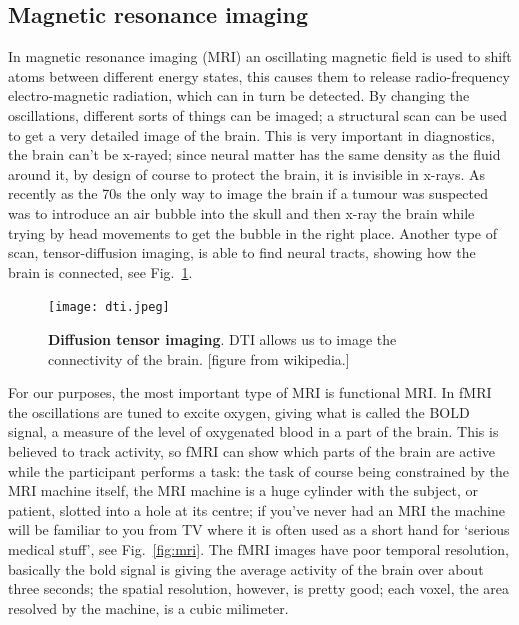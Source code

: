 \documentclass[12pt]{article}
\begin{document}
\subsection*{Magnetic resonance imaging}

In magnetic resonance imaging (MRI) an oscillating magnetic field is
used to shift atoms between different energy states, this causes them
to release radio-frequency electro-magnetic radiation, which can in
turn be detected. By changing the oscillations, different sorts of
things can be imaged; a structural scan can be used to get a very
detailed image of the brain. This is very important in diagnostics,
the brain can't be x-rayed; since neural matter has the same density
as the fluid around it, by design of course to protect the brain, it
is invisible in x-rays. As recently as the 70s the only way to image
the brain if a tumour was suspected was to introduce an air bubble
into the skull and then x-ray the brain while trying by head movements
to get the bubble in the right place. Another type of scan,
tensor-diffusion imaging, is able to find neural tracts, showing how the brain is connected, see Fig.~\ref{fig:dti}.


\begin{figure}
  \begin{center}
    \texttt{[image: dti.jpeg]}
    \end{center}
  \caption{\textbf{Diffusion tensor imaging}. DTI allows us to image the connectivity of the brain. [figure from wikipedia.]\label{fig:dti}}
\end{figure}

For our purposes, the most important type of MRI is functional MRI. In
fMRI the oscillations are tuned to excite oxygen, giving what is
called the BOLD signal, a measure of the level of oxygenated blood in
a part of the brain. This is believed to track activity, so fMRI can
show which parts of the brain are active while the participant
performs a task: the task of course being constrained by the MRI
machine itself, the MRI machine is a huge cylinder with the subject,
or patient, slotted into a hole at its centre; if you've never had an
MRI the machine will be familiar to you from TV where it is often used
as a short hand for `serious medical stuff', see
Fig.~\ref{fig:mri}. The fMRI images have poor temporal resolution,
basically the bold signal is giving the average activity of the brain
over about three seconds; the spatial resolution, however, is pretty
good; each voxel, the area resolved by the machine, is a cubic
milimeter.
\end{document}
